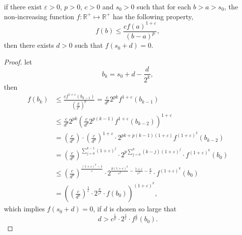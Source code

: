 \begin{lemma}
	if there exist $\varepsilon>0$, $p>0$, $c>0$ and $s_0>0$ such that
	for each $b>a>s_0$, the non-increasing function $f:\mathbb{R}^+\mapsto\mathbb{R}^+$ has the following property,
	\[
		f(b) \leq \frac{cf(a)^{1+\varepsilon}}{(b-a)^p},
	\]
	then there exists $d>0$ such that $f(s_0 + d) = 0$.
\end{lemma}
\begin{proof}
	let
	\[
		b_k = s_0+d-\frac{d}{2^k},
	\]
	then 
	\begin{align*}
		f(b_k) &\leq \frac{cf^{1+\varepsilon}(b_{k-1})}{\left(\frac{d}{2^k}\right)^p}
			= \frac{c}{d^p}2^{pk}f^{1+\varepsilon}(b_{k-1})\\
			&\leq  \frac{c}{d^p}2^{pk}\left(\frac{c}{d^p}2^{p(k-1)}f^{1+\varepsilon}(b_{k-2})\right)^{1+\varepsilon}\\
			&= \left(\frac{c}{d^p}\right)\cdot \left(\frac{c}{d^p}\right)^{1+\varepsilon}
				\cdot 2^{pk + p(k-1)(1+\varepsilon)}f^{(1+\varepsilon)^2}(b_{k-2})\\
			&= \left(\frac{c}{d^p}\right)^{\sum_{j=0}^{k-1}(1+\varepsilon)^j}
				\cdot 2^{p\sum_{j=0}^k(k-j)(1+\varepsilon)^j}
				\cdot f^{(1+\varepsilon)^k}(b_0)\\
			&\leq \left(\frac{c}{d^p}\right)^{\frac{(1+\varepsilon)^k-1}{\varepsilon}}
				\cdot 2^{\frac{p(1+\varepsilon)^k}{\varepsilon^2}-\frac{1+\varepsilon}{\varepsilon^2}-\frac{k}{\varepsilon}}
				\cdot f^{(1+\varepsilon)^k}(b_0)\\
			&= \left(\left(\frac{c}{d^p}\right)^{\frac{1}{\varepsilon}}
				\cdot 2^{\frac{p}{\varepsilon^2}}
				\cdot f(b_0)\right)^{(1+\varepsilon)^k},
	\end{align*}
	which implies $f(s_0 + d) = 0$, if $d$ is chosen so large that 
	\[
		d > c^{\frac{1}{p}} 
			\cdot 2^{\frac{1}{\varepsilon}}
			\cdot f^{\frac{\varepsilon}{p}}(b_0).
	\] 
\end{proof}

